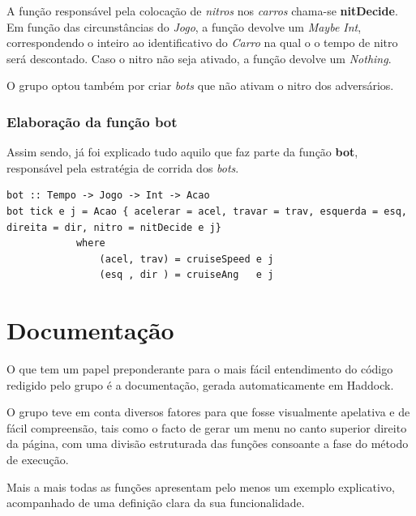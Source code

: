\documentclass[a4paper]{report} %
\begin{document}
A função responsável pela colocação de \emph{nitros} nos \emph{carros} chama-se \textbf{nitDecide}. Em função das circunstâncias do \emph{Jogo}, a função devolve um \emph{Maybe Int}, correspondendo o inteiro ao identificativo do \emph{Carro} na qual o o tempo de nitro será descontado. Caso o nitro não seja ativado, a função devolve um \emph{Nothing}.

O grupo optou também por criar \textit{bots} que não ativam o nitro dos adversários.

\subsubsection{Elaboração da função \textbf{bot}}

Assim sendo, já foi explicado tudo aquilo que faz parte da função \textbf{bot}, responsável pela estratégia de corrida dos \textit{bots}.

\scriptsize

\begin{verbatim}
bot :: Tempo -> Jogo -> Int -> Acao 
bot tick e j = Acao { acelerar = acel, travar = trav, esquerda = esq, direita = dir, nitro = nitDecide e j}  
            where
                (acel, trav) = cruiseSpeed e j
                (esq , dir ) = cruiseAng   e j

\end{verbatim}  

\normalsize

\newpage

\section{Documentação}

O que tem um papel preponderante para o mais fácil entendimento do código redigido pelo grupo é a documentação, gerada automaticamente em Haddock.

O grupo teve em conta diversos fatores para que fosse visualmente apelativa e de fácil compreensão, tais como o facto de gerar um menu no canto superior direito da página, com uma divisão estruturada das funções consoante a fase do método de execução.

Mais a mais todas as funções apresentam pelo menos um exemplo explicativo, acompanhado de uma definição clara da sua funcionalidade. 
\end{document}
